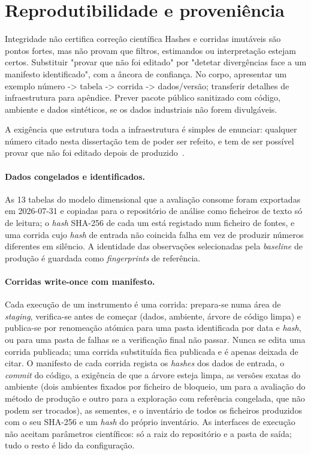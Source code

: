 \section{Reprodutibilidade e proveniência}
\label{sec:reprodutibilidade}
{Integridade não certifica correção científica}
{Hashes e corridas imutáveis são pontos fortes, mas não provam que
filtros, estimandos ou interpretação estejam certos. Substituir "provar
que não foi editado" por "detetar divergências face a um manifesto
identificado", com a âncora de confiança. No corpo, apresentar um exemplo
número -\textgreater{} tabela -\textgreater{} corrida -\textgreater{} dados/versão; transferir detalhes de
infraestrutura para apêndice. Prever pacote público sanitizado com código,
ambiente e dados sintéticos, se os dados industriais não forem divulgáveis.}%

A exigência que estrutura toda a infraestrutura é simples de enunciar:
qualquer número citado nesta dissertação tem de poder ser refeito, e tem
de ser possível provar que não foi editado depois de
produzido~\cite{Peng2011,Sandve2013}.

\paragraph{Dados congelados e identificados.} As 13 tabelas do modelo
dimensional que a avaliação consome foram exportadas em 2026-07-31 e
copiadas para o repositório de análise como ficheiros de texto só de
leitura; o \emph{hash} SHA-256 de cada um está registado num ficheiro de
fontes, e uma corrida cujo \emph{hash} de entrada não coincida falha em vez
de produzir números diferentes em silêncio. A identidade das observações
selecionadas pela \emph{baseline} de produção é guardada como
\emph{fingerprints} de referência.

\paragraph{Corridas write-once com manifesto.} Cada execução de um
instrumento é uma corrida: prepara-se numa área de \emph{staging},
verifica-se antes de começar (dados, ambiente, árvore de código limpa) e
publica-se por renomeação atómica para uma pasta identificada por data e
\emph{hash}, ou para uma pasta de falhas se a verificação final não
passar. Nunca se edita uma corrida publicada; uma corrida substituída
fica publicada e é apenas deixada de citar. O manifesto de cada corrida
regista os \emph{hashes} dos dados de entrada, o \emph{commit} do código, a
exigência de que a árvore esteja limpa, as versões exatas do ambiente
(dois ambientes fixados por ficheiro de bloqueio, um para a avaliação do
método de produção e outro para a exploração com referência congelada, que
não podem ser trocados), as sementes, e o inventário de todos os ficheiros
produzidos com o seu SHA-256 e um \emph{hash} do próprio inventário. As
interfaces de execução não aceitam parâmetros científicos: só a raiz do
repositório e a pasta de saída; tudo o resto é lido da configuração.

